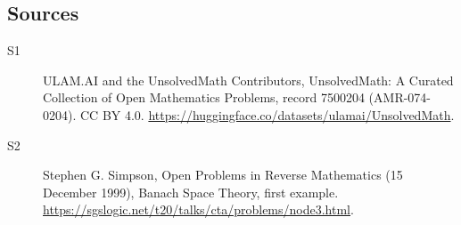 \documentclass[11pt]{article}
\begin{document}
\subsection{Sources}
\begin{description}
\item[\hypertarget{source:7500204:1}{S1}] ULAM.AI and the UnsolvedMath Contributors, UnsolvedMath: A Curated Collection of Open Mathematics Problems, record 7500204 (AMR-074-0204). CC BY 4.0. \url{https://huggingface.co/datasets/ulamai/UnsolvedMath}.
\item[\hypertarget{source:7500204:2}{S2}] Stephen G. Simpson, Open Problems in Reverse Mathematics (15 December 1999), Banach Space Theory, first example. \url{https://sgslogic.net/t20/talks/cta/problems/node3.html}.
\end{description}
\label{end:7500204}
\end{document}
